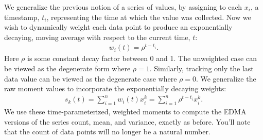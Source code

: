 \documentclass{article}
\begin{document}
We generalize the previous notion of a series of values, by assigning to each $x_i$, a timestamp, $t_i$, representing the time at which the value was collected. Now we wish to dynamically weight each data point to produce an exponentially decaying, moving average with respect to the current time, $t$:
\begin{align}
w_i(t)=\rho^{t-t_i}.
\end{align}
Here $\rho$ is some constant decay factor between 0 and 1. The unweighted case can be viewed as the degenerate form where $\rho=1$. Similarly, tracking only the last data value can be viewed as the degenerate case where $\rho=0$. We generalize the raw moment values to incorporate the exponentially decaying weights:
\begin{align}
s_k(t) = \sum_{i=1}^{n}{w_i(t)x_i^k} = \sum_{i=1}^{n}{\rho^{t-t_i} x_i^k}.
\end{align}
We use these time-parameterized, weighted moments to compute the EDMA versions of the series count, mean, and variance, exactly as before. You'll note that the count of data points will no longer be a natural number.
\end{document}
